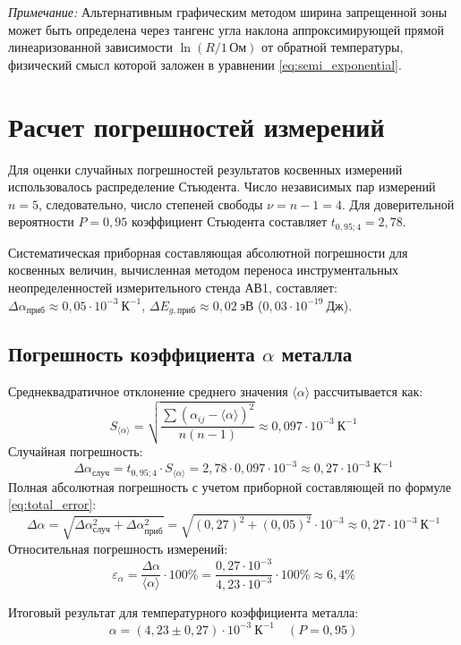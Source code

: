 \documentclass[12pt]{article}
\begin{document}
\textit{Примечание:} Альтернативным графическим методом ширина запрещенной зоны может быть определена через тангенс угла наклона аппроксимирующей прямой линеаризованной зависимости $\ln (R / 1\,\text{Ом})$ от обратной температуры, физический смысл которой заложен в уравнении \eqref{eq:semi_exponential}.

\section{Расчет погрешностей измерений}
Для оценки случайных погрешностей результатов косвенных измерений использовалось распределение Стьюдента. Число независимых пар измерений $n = 5$, следовательно, число степеней свободы $\nu = n - 1 = 4$. Для доверительной вероятности $P = 0{,}95$ коэффициент Стьюдента составляет $t_{0{,}95; 4} = 2{,}78$.

Систематическая приборная составляющая абсолютной погрешности для косвенных величин, вычисленная методом переноса инструментальных неопределенностей измерительного стенда АВ1, составляет: $\Delta \alpha_{\text{приб}} \approx 0{,}05 \cdot 10^{-3}~\text{К}^{-1}$, $\Delta E_{g,\text{приб}} \approx 0{,}02~\text{эВ}$ ($0{,}03 \cdot 10^{-19}~\text{Дж}$).

\subsection{Погрешность коэффициента \texorpdfstring{$\alpha$}{alpha} металла}
Среднеквадратичное отклонение среднего значения $\langle \alpha \rangle$ рассчитывается как:
$$ S_{\langle \alpha \rangle} = \sqrt{\frac{\sum (\alpha_{ij} - \langle \alpha \rangle)^2}{n(n-1)}} \approx 0{,}097 \cdot 10^{-3}~\text{К}^{-1} $$
Случайная погрешность:
$$ \Delta \alpha_{\text{случ}} = t_{0{,}95; 4} \cdot S_{\langle \alpha \rangle} = 2{,}78 \cdot 0{,}097 \cdot 10^{-3} \approx 0{,}27 \cdot 10^{-3}~\text{К}^{-1} $$
Полная абсолютная погрешность с учетом приборной составляющей по формуле \eqref{eq:total_error}:
$$ \Delta \alpha = \sqrt{\Delta \alpha_{\text{случ}}^2 + \Delta \alpha_{\text{приб}}^2} = \sqrt{(0{,}27)^2 + (0{,}05)^2} \cdot 10^{-3} \approx 0{,}27 \cdot 10^{-3}~\text{К}^{-1} $$
Относительная погрешность измерений:
$$ \varepsilon_{\alpha} = \frac{\Delta \alpha}{\langle \alpha \rangle} \cdot 100\% = \frac{0{,}27 \cdot 10^{-3}}{4{,}23 \cdot 10^{-3}} \cdot 100\% \approx 6{,}4\% $$

Итоговый результат для температурного коэффициента металла:
\begin{equation}
    \alpha = (4{,}23 \pm 0{,}27) \cdot 10^{-3}~\text{К}^{-1} \quad (P = 0{,}95)
\end{equation}
\end{document}

